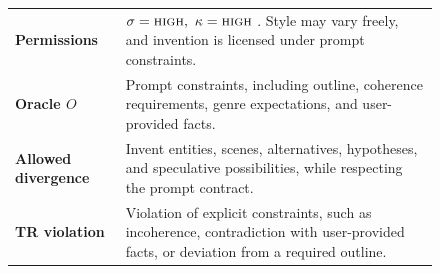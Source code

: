 \documentclass[11pt]{article}
\newcommand{\sigmakappa}[2]{%
  \(\sigma=\textsc{#1},\ \kappa=\textsc{#2}\)%
}
\newcommand{\field}[1]{\textbf{#1}}
\begin{document}
\begin{figure}[tb]
\begin{tcolorbox}[
  truthregimecard,
  title={Ideation / fiction-writing},
  colback=TRPurple,
  colframe=TRPurpleFrame
]
\begin{tabularx}{\linewidth}{@{}p{3.4cm}X@{}}
\field{Permissions} &
\sigmakappa{high}{high}. Style may vary freely, and invention is licensed under prompt constraints. \\[4pt]

\field{Oracle \(O\)} &
Prompt constraints, including outline, coherence requirements, genre expectations, and user-provided facts. \\[4pt]

\field{Allowed divergence} &
Invent entities, scenes, alternatives, hypotheses, and speculative possibilities, while respecting the prompt contract. \\[4pt]

\field{TR violation} &
Violation of explicit constraints, such as incoherence, contradiction with user-provided facts, or deviation from a required outline.
\end{tabularx}
\end{tcolorbox}

\end{figure}
\end{document}
